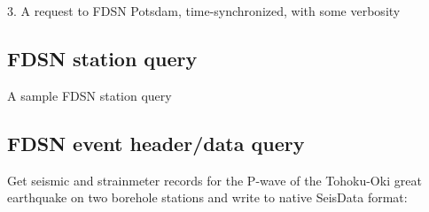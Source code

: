 \documentclass[letterpaper,11pt,english]{sphinxmanual}
\begin{document}
3. A request to FDSN Potsdam, time-synchronized, with some verbosity

%
\begin{sphinxVerbatim}[commandchars=\\\{\}]
  
  
        
\end{sphinxVerbatim}


\subsection{FDSN station query}
\label{\detokenize{src/Appendices/examples:fdsn-station-query}}
A sample FDSN station query

%
\begin{sphinxVerbatim}[commandchars=\\\{\}]
  
\end{sphinxVerbatim}


\subsection{FDSN event header/data query}
\label{\detokenize{src/Appendices/examples:fdsn-event-header-data-query}}
Get seismic and strainmeter records for the P-wave of the Tohoku-Oki great earthquake on two borehole stations and write to native SeisData format:

%
\begin{sphinxVerbatim}[commandchars=\\\{\}]
   
 
\end{sphinxVerbatim}
\end{document}
